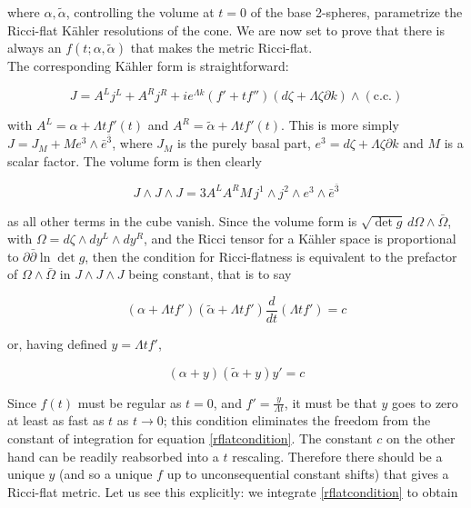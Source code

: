 where $\alpha,\tilde\alpha$, controlling the volume at $t=0$ of the base 2-spheres, parametrize the Ricci-flat K\"ahler resolutions of the cone. We are now set to prove that there is always an $f(t;\alpha,\tilde\alpha)$ that makes the metric Ricci-flat.\\

The corresponding K\"ahler form is straightforward:

\begin{equation}
	J = A^L j^L + A^R j^R + i e^{\Lambda k} (f' + t f'') (d\zeta + \Lambda \zeta \partial k) \wedge (\mathrm{c.c.})
\end{equation}

\newcommand{\fibral}{e^3 \wedge \bar e^{\bar 3}}

with $A^L = \alpha + \Lambda t f'(t)$ and  $A^R = \tilde\alpha + \Lambda t f'(t)$. This is more simply $J = J_M + M \fibral$, where $J_M$ is the purely basal part, $e^3 = d\zeta + \Lambda \zeta \partial k$ and $M$ is a scalar factor. The volume form is then clearly

\begin{equation}
	J \wedge J \wedge J = 3 A^L A^R M \, j^1 \wedge j^2 \wedge \fibral
\end{equation}

as all other terms in the cube vanish. Since the volume form is $\sqrt{\det g} \, d\Omega \wedge \bar \Omega$, with $\Omega = d\zeta \wedge dy^L \wedge dy^R$, and the Ricci tensor for a K\"ahler space is proportional to $\partial \bar \partial \ln \det g$, then the condition for Ricci-flatness is equivalent to the prefactor of $\Omega \wedge \bar \Omega$ in $J\wedge J \wedge J$ being constant, that is to say

\begin{equation}
	(\alpha + \Lambda t f')(\tilde{\alpha} + \Lambda t f') \frac{d}{dt} (\Lambda t f') = c \label{rflatcondition}
\end{equation}

or, having defined $y = \Lambda t f'$,

\begin{equation}
	(\alpha + y)(\tilde{\alpha} + y) y' = c
\end{equation}

Since $f(t)$ must be regular as $t=0$, and $f' = \frac{y}{\Lambda t}$, it must be that $y$ goes to zero at least as fast as $t$ as $t\rightarrow 0$; this condition eliminates the freedom from the constant of integration for equation \ref{rflatcondition}. The constant $c$ on the other hand can be readily reabsorbed into a $t$ rescaling. Therefore there should be a unique $y$ (and so a unique $f$ up to unconsequential constant shifts) that gives a Ricci-flat metric. Let us see this explicitly: we integrate \ref{rflatcondition} to obtain

